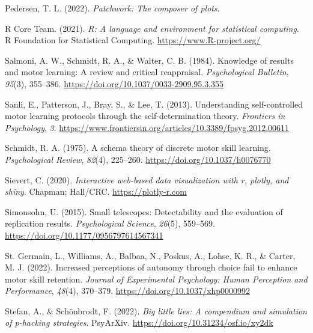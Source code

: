 \documentclass[
  doc, donotrepeattitle,floatsintext]{apa7}
\newlength{\cslhangindent}
\newlength{\cslentryspacingunit} %
\newenvironment{CSLReferences}[2] %
 {%
  \setlength{\parindent}{0pt}
  \ifodd #1
  \let\oldpar\par
  \def\par{\hangindent=\cslhangindent\oldpar}
  \fi
  \setlength{\parskip}{#2\cslentryspacingunit}
 }%
 {}
\begin{document}
\begin{CSLReferences}{1}{0}
\leavevmode{}%
Pedersen, T. L. (2022). \emph{Patchwork: The composer of plots}.

\leavevmode{}%
R Core Team. (2021). \emph{R: A language and environment for statistical computing}. R Foundation for Statistical Computing. \url{https://www.R-project.org/}

\leavevmode{}%
Salmoni, A. W., Schmidt, R. A., \& Walter, C. B. (1984). Knowledge of results and motor learning: A review and critical reappraisal. \emph{Psychological Bulletin}, \emph{95}(3), 355--386. \url{https://doi.org/10.1037/0033-2909.95.3.355}

\leavevmode{}%
Sanli, E., Patterson, J., Bray, S., \& Lee, T. (2013). Understanding self-controlled motor learning protocols through the self-determination theory. \emph{Frontiers in Psychology}, \emph{3}. \url{https://www.frontiersin.org/articles/10.3389/fpsyg.2012.00611}

\leavevmode{}%
Schmidt, R. A. (1975). A schema theory of discrete motor skill learning. \emph{Psychological Review}, \emph{82}(4), 225--260. \url{https://doi.org/10.1037/h0076770}

\leavevmode{}%
Sievert, C. (2020). \emph{Interactive web-based data visualization with r, plotly, and shiny}. Chapman; Hall/CRC. \url{https://plotly-r.com}

\leavevmode{}%
Simonsohn, U. (2015). Small telescopes: Detectability and the evaluation of replication results. \emph{Psychological Science}, \emph{26}(5), 559--569. \url{https://doi.org/10.1177/0956797614567341}

\leavevmode{}%
St. Germain, L., Williams, A., Balbaa, N., Poskus, A., Lohse, K. R., \& Carter, M. J. (2022). Increased perceptions of autonomy through choice fail to enhance motor skill retention. \emph{Journal of Experimental Psychology: Human Perception and Performance}, \emph{48}(4), 370--379. \url{https://doi.org/10.1037/xhp0000992}

\leavevmode{}%
Stefan, A., \& Schönbrodt, F. (2022). \emph{Big little lies: A compendium and simulation of p-hacking strategies}. {PsyArXiv}. \url{https://doi.org/10.31234/osf.io/xy2dk}


\end{CSLReferences}
\end{document}
